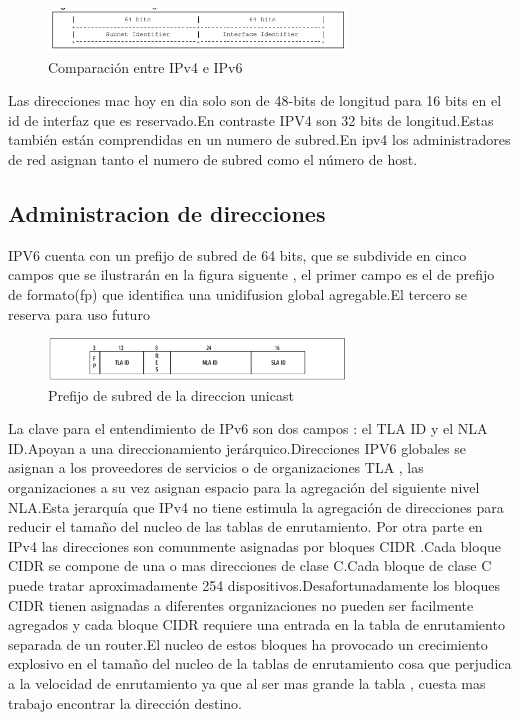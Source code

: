 \documentclass[11pt,a4paper]{article}
\begin{document}
\begin{figure}[h!]
 \centering
 \includegraphics[width=0.71\textwidth]{v6vsv4.png}
 \caption[Comparaciones]{Comparación entre IPv4 e IPv6}
\end{figure} \par

Las direcciones mac hoy en dia solo son de 48-bits de longitud para 16 bits en el id de interfaz que es reservado.En contraste IPV4 son 32 bits de longitud.Estas también están comprendidas en un numero de subred.En ipv4 los administradores de red asignan tanto el numero de subred como el número de host.
\subsection{Administracion de direcciones}
IPV6 cuenta con un prefijo de subred de 64 bits, que se subdivide en cinco campos que se ilustrarán en la figura siguente , el primer campo es el de prefijo de formato(fp) que identifica una unidifusion global agregable.El tercero se reserva para uso futuro
\begin{figure}[h!]
 \centering
 \includegraphics[width=0.71\textwidth]{asign.png}
 \caption[Asignacion de prefijo]{Prefijo de subred de la direccion unicast}
\end{figure} \par
La clave para el entendimiento de IPv6 son dos campos : el TLA ID y el NLA ID.Apoyan a una direccionamiento jerárquico.Direcciones IPV6 globales se asignan a los proveedores de servicios o de organizaciones TLA , las organizaciones a su vez asignan espacio para la agregación del siguiente nivel NLA.Esta jerarquía que IPv4 no tiene estimula la agregación de direcciones para reducir el tamaño del nucleo de las tablas de enrutamiento.
Por otra parte en IPv4 las direcciones son comunmente asignadas por bloques CIDR .Cada bloque CIDR se compone de una o mas direcciones de clase C.Cada bloque de clase C puede tratar aproximadamente 254 dispositivos.Desafortunadamente los bloques CIDR tienen asignadas a diferentes organizaciones no pueden ser facilmente agregados y cada bloque CIDR requiere una entrada en la tabla de enrutamiento separada de un router.El nucleo de estos bloques ha provocado un crecimiento explosivo en el tamaño del nucleo de la tablas de enrutamiento cosa que perjudica a la velocidad de enrutamiento ya que al ser mas grande la tabla , cuesta mas trabajo encontrar la dirección destino.\par
\end{document}
